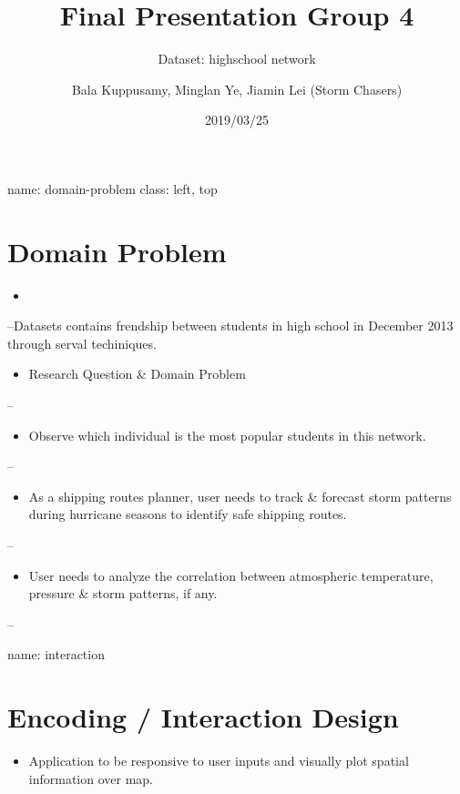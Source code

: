 \documentclass[]{article}
\title{Final Presentation Group 4}
\subtitle{Dataset: highschool network}
\author{Bala Kuppusamy, Minglan Ye, Jiamin Lei (Storm Chasers)}
\date{2019/03/25}
\providecommand{\tightlist}{%
  \setlength{\itemsep}{0pt}\setlength{\parskip}{0pt}}
\begin{document}
\maketitle

name: domain-problem class: left, top

\section{Domain Problem}\label{domain-problem}

\begin{itemize}
\item
\end{itemize}

--Datasets contains frendship between students in high school in
December 2013 through serval techiniques.

\begin{itemize}
\tightlist
\item
  Research Question \& Domain Problem
\end{itemize}

--

\begin{itemize}
\tightlist
\item
  Observe which individual is the most popular students in this network.
\end{itemize}

--

\begin{itemize}
\tightlist
\item
  As a shipping routes planner, user needs to track \& forecast storm
  patterns during hurricane seasons to identify safe shipping routes.
\end{itemize}

--

\begin{itemize}
\tightlist
\item
  User needs to analyze the correlation between atmospheric temperature,
  pressure \& storm patterns, if any.
\end{itemize}

--

name: interaction

\section{Encoding / Interaction
Design}\label{encoding-interaction-design}

\begin{itemize}
\tightlist
\item
  Application to be responsive to user inputs and visually plot spatial
  information over map.
\end{itemize}
\end{document}
